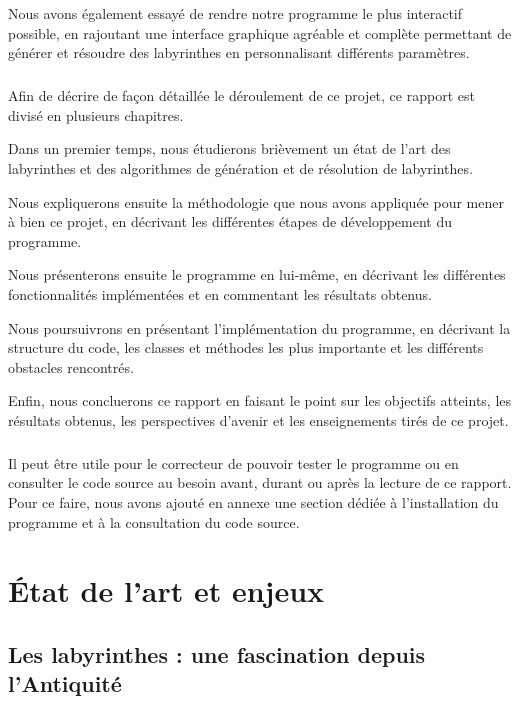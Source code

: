 \documentclass[12pt]{scrreprt} %
\begin{document}
Nous avons également essayé de rendre notre programme le plus interactif possible, en rajoutant une interface graphique agréable et complète permettant de générer et résoudre des labyrinthes en personnalisant différents paramètres.

\paragraph{}

Afin de décrire de façon détaillée le déroulement de ce projet, ce rapport est divisé en plusieurs chapitres.

Dans un premier temps, nous étudierons brièvement un état de l'art des labyrinthes et des algorithmes de génération et de résolution de labyrinthes.

Nous expliquerons ensuite la méthodologie que nous avons appliquée pour mener à bien ce projet, en décrivant les différentes étapes de développement du programme.

Nous présenterons ensuite le programme en lui-même, en décrivant les différentes fonctionnalités implémentées et en commentant les résultats obtenus.

Nous poursuivrons en présentant l'implémentation du programme, en décrivant la structure du code, les classes et méthodes les plus importante et les différents obstacles rencontrés.

Enfin, nous concluerons ce rapport en faisant le point sur les objectifs atteints, les résultats obtenus, les perspectives d'avenir et les enseignements tirés de ce projet.

\paragraph{}

Il peut être utile pour le correcteur de pouvoir tester le programme ou en consulter le code source au besoin avant, durant ou après la lecture de ce rapport. Pour ce faire, nous avons ajouté en annexe une section dédiée à l'installation du programme et à la consultation du code source.

\chapter{État de l'art et enjeux}


\section{Les labyrinthes : une fascination depuis l'Antiquité}
\end{document}
